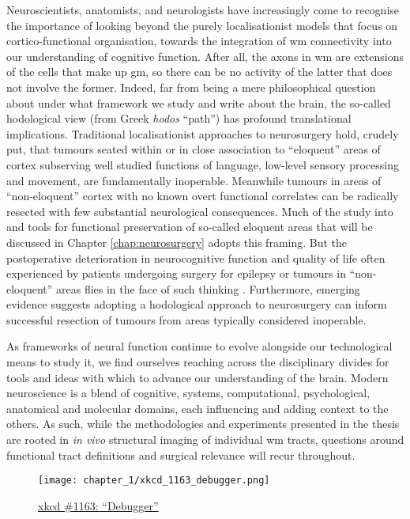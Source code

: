 Neuroscientists, anatomists, and neurologists have increasingly come to recognise the importance of looking beyond the purely localisationist models that focus on cortico-functional organisation, towards the integration of \gls{wm} connectivity into our understanding of cognitive function\autocite{ffytche2005,Catani2007}.
After all, the axons in \gls{wm} are extensions of the cells that make up \gls{gm}, so there can be no activity of the latter that does not involve the former.
Indeed, far from being a mere philosophical question about under what framework we study and write about the brain, the so-called hodological view (from Greek \textit{hodos} ``path'') has profound translational implications.
Traditional localisationist approaches to neurosurgery hold, crudely put, that tumours seated within or in close association to ``eloquent'' areas of cortex subserving well studied functions of language, low-level sensory processing and movement, are fundamentally inoperable.
Meanwhile tumours in areas of ``non-eloquent'' cortex with no known overt functional correlates can be radically resected with few substantial neurological consequences.
Much of the study into and tools for functional preservation of so-called eloquent areas that will be discussed in Chapter \ref{chap:neurosurgery} adopts this framing.
But the postoperative deterioration in neurocognitive function and quality of life often experienced by patients undergoing surgery for epilepsy or tumours in ``non-eloquent'' areas flies in the face of such thinking
\autocite{Satoer2017,Mandonnet2017a,Rijnen2019,Herbet2019,Vigren2020a,Dadario2021}.
Furthermore, emerging evidence suggests adopting a hodological approach to neurosurgery can inform successful resection of tumours from areas typically considered inoperable\autocite{Dadario2021,DeBenedictis2011b,Suzuki2023}.

As frameworks of neural function continue to evolve alongside our technological means to study it, we find ourselves reaching across the disciplinary divides for tools and ideas with which to advance our understanding of the brain.
Modern neuroscience is a blend of cognitive, systems, computational, psychological, anatomical and molecular domains, each influencing and adding context to the others.
As such, while the methodologies and experiments presented in the thesis are rooted in \textit{in vivo} structural imaging of individual \gls{wm} tracts, questions around functional tract definitions and surgical relevance will recur throughout.

\vfill
\begin{figure}[hb!]
  \centering
  \texttt{[image: chapter\_1/xkcd\_1163\_debugger.png]}
  \caption*{\href{https://xkcd.com/1163/}{xkcd \#1163: ``Debugger''}}
  \label{fig:xkcd}
\end{figure}
\vfill

